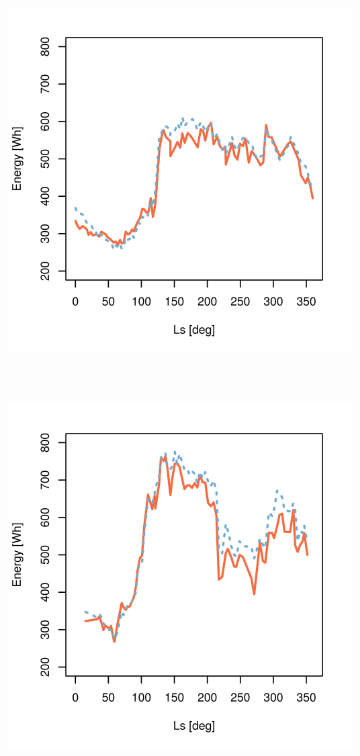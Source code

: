 \begin{figure}[h]
\begin{subfigure}[t]{\subfigureWidth}
  		\includegraphics[height=\graphicsHeight]{sections/mars-solar-energy/photovoltaic-energy/plots/predicted-vs-measured-energy-my30.png}
  		\label{fig:plot:sub:mer-energy-production-predicted-vs-reported-my30}
  	\end{subfigure}\\[0.8ex]
    \begin{subfigure}[t]{\subfigureWidth}
      \centering
  		\includegraphics[height=\graphicsHeight]{sections/mars-solar-energy/photovoltaic-energy/plots/predicted-vs-measured-energy-my32.png}

\end{subfigure}
\end{figure}
